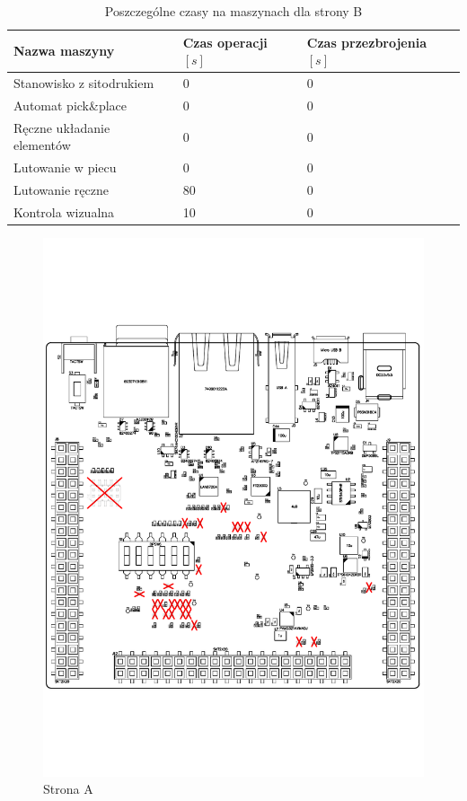 \begin{table}[H]
	\centering
	\caption{Poszczególne czasy na maszynach dla strony B}
	\begin{tabular}{lll}
		\toprule
		Nazwa maszyny                 & Czas operacji $[s]$ & Czas przezbrojenia $[s]$ \\
		\midrule
		Stanowisko z sitodrukiem      & 0                   & 0                        \\
		Automat pick\&place           & 0                   & 0                        \\
		Ręczne układanie elementów & 0                   & 0                        \\
		Lutowanie w piecu             & 0                   & 0                        \\
		Lutowanie ręczne             & 80                  & 0                        \\
		Kontrola wizualna             & 10                  & 0                        \\
		\bottomrule
	\end{tabular}
	\label{liteboard:b}
\end{table}

\begin{figure}[H]
	\centering
	\includegraphics[width=0.8\linewidth,clip, trim=0cm 4cm 0cm 4cm]{./chapters/chapter5/liteboard_A.PDF}
	\caption{Strona A}\label{liteboard:StronaA}
\end{figure}


